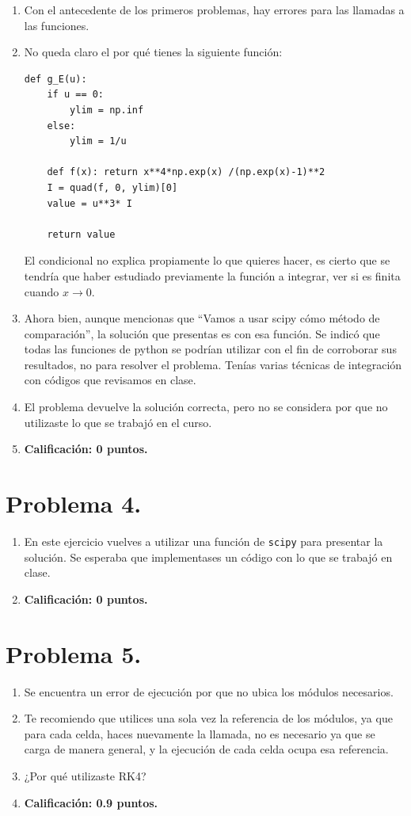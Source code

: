 \begin{enumerate}
\item Con el antecedente de los primeros problemas, hay errores para las llamadas a las funciones.
\item No queda claro el por qué tienes la siguiente función:
\begin{verbatim}
def g_E(u):
    if u == 0:
        ylim = np.inf
    else:
        ylim = 1/u

    def f(x): return x**4*np.exp(x) /(np.exp(x)-1)**2
    I = quad(f, 0, ylim)[0]
    value = u**3* I 
        
    return value
\end{verbatim}
El condicional no explica propiamente lo que quieres hacer, es cierto que se tendría que haber estudiado previamente la función a integrar, ver si es finita cuando $x  \to 0$.
\item Ahora bien, aunque mencionas que \enquote{Vamos a usar scipy cómo método de comparación}, la solución que presentas es con esa función. Se indicó que todas las funciones de python se podrían utilizar con el fin de corroborar sus resultados, no para resolver el problema. Tenías varias técnicas de integración con códigos que revisamos en clase.
\item El problema devuelve la solución correcta, pero no se considera por que no utilizaste lo que se trabajó en el curso.
\item \textbf{Calificación: 0 puntos.}
\end{enumerate}

\section{Problema 4.}

\begin{enumerate}
\item En este ejercicio vuelves a utilizar una función de \texttt{scipy} para presentar la solución. Se esperaba que implementases un código con lo que se trabajó en clase.
\item \textbf{Calificación: 0 puntos.}
\end{enumerate}

\section{Problema 5.}

\begin{enumerate}
\item Se encuentra un error de ejecución por que no ubica los módulos necesarios.
\item Te recomiendo que utilices una sola vez la referencia de los módulos, ya que para cada celda, haces nuevamente la llamada, no es necesario ya que se carga de manera general, y la ejecución de cada celda ocupa esa referencia.
\item ¿Por qué utilizaste RK4?
\item \textbf{Calificación: 0.9 puntos.}
\end{enumerate}

